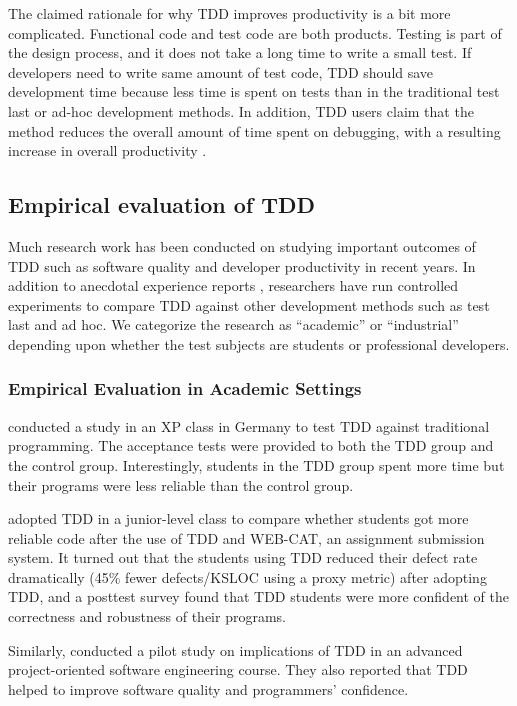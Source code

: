 \documentclass[smallextended]{svjour3}     %
\begin{document}
The claimed rationale for why TDD improves productivity is a bit more
complicated. Functional code and test code are both products. Testing is
part of the design process, and it does not take a long time to write a
small test. If developers need to write same amount of test code, TDD
should save development time because less time is spent on tests than in
the traditional test last or ad-hoc development methods. In addition, TDD
users claim that the method reduces the overall amount of time spent on
debugging, with a resulting increase in overall
productivity \citep{Williams:03}.

\subsection{Empirical evaluation of TDD}
\label{sec:related-empirical}

Much research work has been conducted on studying important outcomes of TDD
such as software quality and developer productivity in recent years. In
addition to anecdotal experience reports
\citep{George:04,Maximilien:03,Williams:03,Kaufmann:03,Edwards:04,Bhat:06},
researchers have run controlled experiments
\citep{Muller:02,Matjaz:03,Erdogmus:05} to compare TDD against other
development methods such as test last and ad hoc. We categorize the
research as ``academic'' or ``industrial'' depending upon whether the test
subjects are students or professional developers.

\subsubsection{Empirical Evaluation in Academic Settings}

\cite{Muller:02} conducted a study in an XP class in
Germany to test TDD against traditional programming.  The acceptance tests
were provided to both the TDD group and the control group. Interestingly,
students in the TDD group spent more time but their programs were less
reliable than the control group.

\cite{Edwards:04} adopted TDD in a junior-level class to compare
whether students got more reliable code after the use of TDD and WEB-CAT,
an assignment submission system. It turned out that the students using TDD
reduced their defect rate dramatically (45\% fewer defects/KSLOC using a
proxy metric) after adopting TDD, and a posttest survey found that TDD
students were more confident of the correctness and robustness of their
programs.

Similarly, \cite{Kaufmann:03} conducted a pilot study
on implications of TDD in an advanced project-oriented software engineering
course. They also reported that TDD helped to improve software quality and
programmers' confidence.
\end{document}
